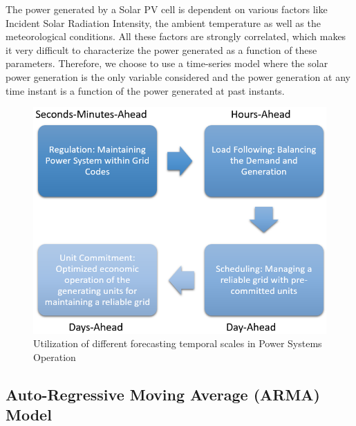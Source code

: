 \documentclass[journal]{IEEEtran}
\begin{document}
The power generated by a Solar PV cell is dependent on various factors like Incident Solar Radiation Intensity, the ambient temperature as well as the meteorological conditions. All these factors are strongly correlated, which makes it very difficult to characterize the power generated as a function of these parameters. \cite{zhou2007novel} Therefore, we choose to use a time-series model where the solar power generation is the only variable considered and the power generation at any time instant is a function of the power generated at past instants. \cite{huang2012solar}

\begin{figure}[htpb]
	\centering
	\includegraphics[scale=0.5]{NeedForecasting.png}
	\caption{Utilization of different forecasting temporal scales in Power Systems Operation}
	\label{fig18} %
\end{figure}

\subsection{Auto-Regressive Moving Average (ARMA) Model}
\end{document}
